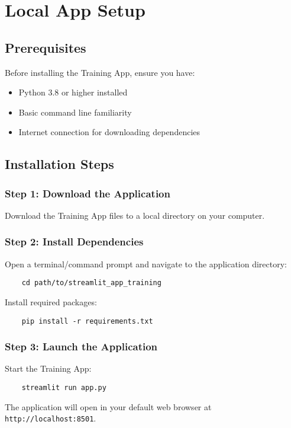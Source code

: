 \chapter{Local App Setup}

\section{Prerequisites}

Before installing the Training App, ensure you have:
\begin{itemize}
	\item Python 3.8 or higher installed
	\item Basic command line familiarity
	\item Internet connection for downloading dependencies
\end{itemize}

\section{Installation Steps}

\subsection{Step 1: Download the Application}
Download the Training App files to a local directory on your computer.

\subsection{Step 2: Install Dependencies}
Open a terminal/command prompt and navigate to the application directory:
\begin{verbatim}
	cd path/to/streamlit_app_training
\end{verbatim}

Install required packages:
\begin{verbatim}
	pip install -r requirements.txt
\end{verbatim}

\subsection{Step 3: Launch the Application}
Start the Training App:
\begin{verbatim}
	streamlit run app.py
\end{verbatim}

The application will open in your default web browser at \verb|http://localhost:8501|.

